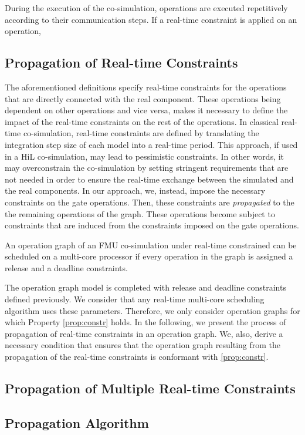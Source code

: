 During the execution of the co-simulation, operations are executed repetitively according to their communication steps. If a real-time constraint is applied on an operation, 

\subsection{Propagation of Real-time Constraints}

The aforementioned definitions specify real-time constraints for the operations that are directly connected with the real component. These operations being dependent on other operations and vice versa, makes it necessary to define the impact of the real-time constraints on the rest of the operations. In classical real-time co-simulation, real-time constraints are defined by translating the integration step size of each model into a real-time period. This approach, if used in a HiL co-simulation, may lead to pessimistic constraints. In other words, it may overconstrain the co-simulation by setting stringent requirements that are not needed in order to ensure the real-time exchange between the simulated and the real components. In our approach, we, instead, impose the necessary constraints on the gate operations. Then, these constraints are \textit{propagated} to the the remaining operations of the graph. These operations become subject to constraints that are induced from the constraints imposed on the gate operations.

\begin{property}
An operation graph of an FMU co-simulation under real-time constrained can be scheduled on a multi-core processor if every operation in the graph is assigned a release and a deadline constraints.
\label{prop:constr}
\end{property}

The operation graph model is completed with release and deadline constraints defined previously. We consider that any real-time multi-core scheduling algorithm uses these parameters. Therefore, we only consider operation graphs for which Property \ref{prop:constr} holds. In the following, we present the process of propagation of real-time constraints in an operation graph. We, also, derive a necessary condition that ensures that the operation graph resulting from the propagation of the real-time constraints is conformant with \ref{prop:constr}.

\subsection{Propagation of Multiple Real-time Constraints}

\subsection{Propagation Algorithm}



